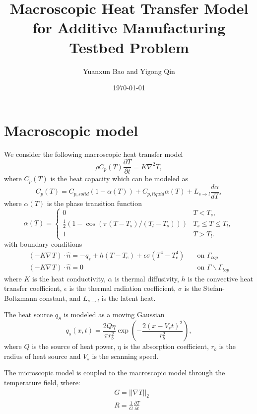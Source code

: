 \documentclass[a4paper,12pt]{article}
\title{Macroscopic Heat Transfer Model for Additive Manufacturing Testbed Problem}
\author{Yuanxun Bao and Yigong Qin}
\date{\today}
\newcommand{\grad}[1]{\nabla_{#1}}
\begin{document}
\maketitle



\section{Macroscopic model}
We consider the following macroscopic heat transfer model
\begin{equation}
\rho C_p(T) \frac{\partial T}{\partial t} = K \grad{}^2 T,
\end{equation}
where $C_p(T)$ is the heat capacity which can be modeled as
\begin{equation}
C_p(T) = C_{p,solid} ( 1-\alpha(T)) + C_{p,liquid} \alpha(T) + L_{s\rightarrow l} \frac{d \alpha}{ dT},
\end{equation}
where $\alpha(T)$ is the phase transition function
\begin{equation}
\alpha(T) = 
\left\{
\begin{array}{lr}
0 & T < T_s, \\
\frac{1}{2}( 1 - \cos(\pi (T-T_s)/ (T_l-T_s))) & T_s \leq T \leq T_l, \\
1 &  T > T_l.
\end{array}
\right.
\end{equation}
with boundary conditions 
\begin{align}
(-K \grad{} T) \cdot \hat{n} = -q_s + h(T - T_e) + \epsilon \sigma (T^4 - T_e^4)  & \quad \text{on } \Gamma_{top} \\
(-K \grad{} T) \cdot \hat{n} = 0  & \quad \text{on } \Gamma  \backslash \Gamma_{top}
\end{align}
where $K$ is the heat conductivity, $\alpha$ is thermal diffusivity, $h$ is the convective heat transfer coefficient, $\epsilon$ is the thermal radiation coefficient, $\sigma$ is the Stefan-Boltzmann constant, and $L_{s\rightarrow l}$ is the latent heat. 

The heat source $q_S$ is modeled as a moving Gaussian
\begin{equation}
q_s(x, t ) = \frac{2Q\eta}{\pi r_b^2} \exp \left( -\frac{ 2(x-V_s t)^2}{ r_b^2} \right),
\end{equation}
where $Q$ is the source of heat power, $\eta$ is the absorption coefficient, $r_b$ is the radius of heat source and $V_s$ is the scanning speed.  

The microscopic model  is coupled to the macroscopic model through the temperature field, where:
\begin{align}
    &G = ||\nabla {T}||_2 \\
    &R = \frac{1}{G}\frac{\partial {T}}{\partial t}
\end{align}
\end{document}
